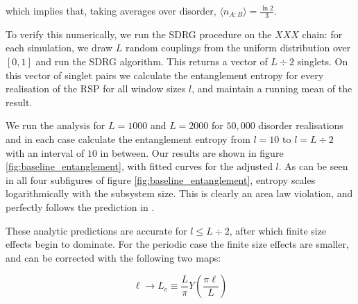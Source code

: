 which implies that, taking averages over disorder, $\langle n_{A: B} \rangle = \frac{\ln 2}{3}$. 

To verify this numerically, we run the SDRG procedure on the $XXX$ chain: for each simulation, we draw $L$ random couplings from the uniform distribution over $[0, 1]$ and run the SDRG algorithm. This returns a vector of $L \div 2$ singlets.  On this vector of singlet pairs we  calculate the entanglement entropy for every realisation of the RSP for all window sizes $l$, and maintain a running mean of the result. 



 We run the analysis for $L = 1000$ and $L = 2000$ for $50,000$ disorder realisations and in each case calculate the entanglement entropy from $l = 10$ to $l = L \div 2$ with an interval of $10$ in between. Our results are shown in figure \ref{fig:baseline_entanglement}, with fitted curves for the adjusted $l$. As can be seen in all four subfigures of figure \ref{fig:baseline_entanglement}, entropy scales logarithmically with the subsystem size. This is clearly an area law violation, and perfectly follows the prediction in \cite{refael2004}.
 
These analytic predictions are accurate for $l \leq L \div 2$, after which finite size effects begin to dominate. For the periodic case the finite size effects are smaller, and can be corrected with the following two maps: 

\begin{equation}\label{eq:L_mapping}
\ell \rightarrow L_{c} \equiv \frac{L}{\pi} Y\left(\frac{\pi \ell}{L}\right)
\end{equation}

